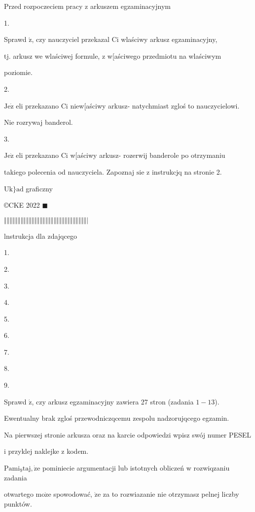\documentclass[a4paper,12pt]{article}
\begin{document}
Przed rozpoczeciem pracy z arkuszem egzaminacyjnym

1.

Sprawd $\acute{\mathrm{z}}$, czy nauczyciel przekazal Ci wlaściwy arkusz egzaminacyjny,

tj. arkusz we wlaściwej formule, z w[aściwego przedmiotu na wlaściwym

poziomie.

2.

$\mathrm{J}\mathrm{e}\dot{\mathrm{z}}$ eli przekazano Ci niew[aściwy arkusz- natychmiast zgloś to nauczycielowi.

Nie rozrywaj banderol.

3.

$\mathrm{J}\mathrm{e}\dot{\mathrm{z}}$ eli przekazano Ci w[aściwy arkusz- rozerwij banderole po otrzymaniu

takiego polecenia od nauczyciela. Zapoznaj $\mathrm{s}\mathrm{i}\mathrm{e}$ z instrukcjq na stronie 2.

$\mathrm{U}\mathrm{k}\}\mathrm{a}\mathrm{d}$ graficzny

\copyright CKE 2022 $\blacksquare$

$\Vert\Vert\Vert\Vert\Vert\Vert\Vert\Vert\Vert\Vert\Vert\Vert\Vert\Vert\Vert\Vert\Vert\Vert\Vert\Vert\Vert\Vert\Vert\Vert\Vert\Vert\Vert\Vert\Vert\Vert|$




lnstrukcja dla zdajqcego

1.

2.

3.

4.

5.

6.

7.

8.

9.

Sprawd $\acute{\mathrm{z}}$, czy arkusz egzaminacyjny zawiera 27 stron (zadania $1-13$).

Ewentualny brak zgloś przewodniczqcemu zespolu nadzorujqcego egzamin.

Na pierwszej stronie arkusza oraz na karcie odpowiedzi wpisz swój numer PESEL

i przyklej naklejke z kodem.

$\mathrm{P}\mathrm{a}\mathrm{m}\mathrm{i}_{9}\mathrm{t}\mathrm{a}\mathrm{j}, \dot{\mathrm{z}}\mathrm{e}$ pominiecie argumentacji lub istotnych obliczeń w rozwiqzaniu zadania

otwartego $\mathrm{m}\mathrm{o}\dot{\mathrm{z}}\mathrm{e}$ spowodować, $\dot{\mathrm{z}}\mathrm{e}$ za to rozwiazanie nie otrzymasz pelnej liczby punktów.
\end{document}

